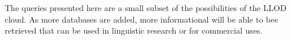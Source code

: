 The queries presented here are a small subset of the possibilities of the LLOD cloud. As more databases are added, more informational will be able to bee retrieved that can be used in linguistic research or for commercial uses. 
